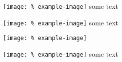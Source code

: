 \texttt{[image: \%
	example-image]}
some text

\texttt{[image: \%
	example-image]}%
some text

\texttt{[image: \%
	example-image]} %

\texttt{[image: \%
	example-image]}
some text
